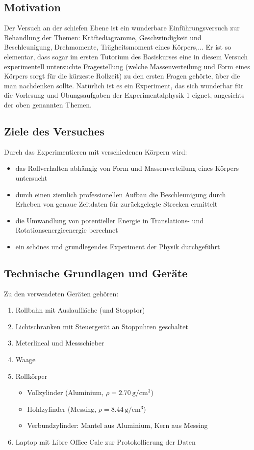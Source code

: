 \subsection{Motivation}
Der Versuch an der schiefen Ebene ist ein wunderbare Einführungsversuch zur Behandlung der Themen: Kräftediagramme, Geschwindigkeit und Beschleunigung, Drehmomente, Trägheitsmoment eines Körpers,... Er ist so elementar, dass sogar im ersten Tutorium des Basiskurses eine in diesem Versuch experimentell untersuchte Fragestellung (welche Massenverteilung und Form eines Körpers sorgt für die kürzeste Rollzeit) zu den ersten Fragen gehörte, über die man nachdenken sollte. Natürlich ist es ein Experiment, das sich wunderbar für die Vorlesung und Übungsaufgaben der Experimentalphysik 1 eignet, angesichts der oben genannten Themen. 

\subsection{Ziele des Versuches}
Durch das Experimentieren mit verschiedenen Körpern wird:
\begin{itemize}
    \item das Rollverhalten abhängig von Form und Massenverteilung eines Körpers untersucht
    \item durch einen ziemlich professionellen Aufbau die Beschleunigung durch Erheben von genaue Zeitdaten für zurückgelegte Strecken ermittelt 
    \item die Umwandlung von potentieller Energie in Translations- und Rotationsenergieenergie berechnet
    \item ein schönes und grundlegendes Experiment der Physik durchgeführt
\end{itemize}

\subsection{Technische Grundlagen und Geräte}
Zu den verwendeten Geräten gehören:
\begin{enumerate}
    \item Rollbahn mit Auslauffläche (und Stopptor)
    \item Lichtschranken mit Steuergerät an Stoppuhren geschaltet
    \item Meterlineal und Messschieber
    \item Waage 
    \item Rollkörper\begin{itemize}
        \item Vollzylinder (Aluminium, \(\rho = \qty{2.70}{\gram\per\cm\cubed}\))
        \item Hohlzylinder (Messing, \(\rho = \qty{8.44}{\gram\per\cm\cubed}\))
        \item Verbundzylinder: Mantel aus Aluminium, Kern aus Messing
    \end{itemize}
    \item Laptop mit Libre Office Calc zur Protokollierung der Daten
\end{enumerate}

